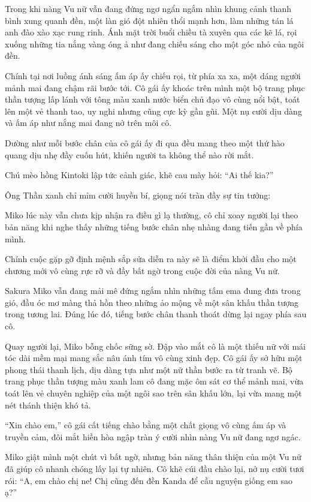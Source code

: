 \documentclass[../main.tex]{subfiles}
\begin{document}
Trong khi nàng Vu nữ vẫn đang đứng ngơ ngẩn ngắm nhìn khung cảnh thanh bình xung quanh đền, một làn gió đột nhiên thổi mạnh hơn, làm những tán lá anh đào xào xạc rung rinh. Ánh mặt trời buổi chiều tà xuyên qua các kẽ lá, rọi xuống những tia nắng vàng óng ả như đang chiếu sáng cho một góc nhỏ của ngôi đền.

Chính tại nơi luồng ánh sáng ấm áp ấy chiếu rọi, từ phía xa xa, một dáng người mảnh mai đang chậm rãi bước tới. Cô gái ấy khoác trên mình một bộ trang phục thần tượng lấp lánh với tông màu xanh nước biển chủ đạo vô cùng nổi bật, toát lên một vẻ thanh tao, uy nghi nhưng cũng cực kỳ gần gũi. Một nụ cười dịu dàng và ấm áp như nắng mai đang nở trên môi cô.

Dường như mỗi bước chân của cô gái ấy đi qua đều mang theo một thứ hào quang dịu nhẹ đầy cuốn hút, khiến người ta không thể nào rời mắt.

Chú mèo hồng Kintoki lập tức cảnh giác, khẽ cau mày hỏi: ``Ai thế kia?''

Ông Thần xanh chỉ mỉm cười huyền bí, giọng nói tràn đầy sự tin tưởng: 

Miko lúc này vẫn chưa kịp nhận ra điều gì lạ thường, cô chỉ xoay người lại theo bản năng khi nghe thấy những tiếng bước chân nhẹ nhàng đang tiến gần về phía mình.

Chính cuộc gặp gỡ định mệnh sắp sửa diễn ra này sẽ là điểm khởi đầu cho một chương mới vô cùng rực rỡ và đầy bất ngờ trong cuộc đời của nàng Vu nữ.

\il

Sakura Miko vẫn đang mải mê đứng ngắm nhìn những tấm ema đung đưa trong gió, đầu óc mơ màng thả hồn theo những ảo mộng về một sân khấu thần tượng trong tương lai. Đúng lúc đó, tiếng bước chân thanh thoát dừng lại ngay phía sau cô.

Quay người lại, Miko bỗng chốc sững sờ. Đập vào mắt cô là một thiếu nữ với mái tóc dài mềm mại mang sắc nâu ánh tím vô cùng xinh đẹp. Cô gái ấy sở hữu một phong thái thanh lịch, dịu dàng tựa như một nữ thần bước ra từ tranh vẽ. Bộ trang phục thần tượng màu xanh lam cô đang mặc ôm sát cơ thể mảnh mai, vừa toát lên vẻ chuyên nghiệp của một ngôi sao trên sân khấu lớn, lại vừa mang một nét thánh thiện khó tả.

``Xin chào em,'' cô gái cất tiếng chào bằng một chất giọng vô cùng ấm áp và truyền cảm, đôi mắt hiền hòa ngập tràn ý cười nhìn nàng Vu nữ đang ngơ ngác.

Miko giật mình một chút vì bất ngờ, nhưng bản năng thân thiện của một Vu nữ đã giúp cô nhanh chóng lấy lại tự nhiên. Cô khẽ cúi đầu chào lại, nở nụ cười tươi rói: ``A, em chào chị ne! Chị cũng đến đền Kanda để cầu nguyện giống em sao ạ?''
\end{document}
